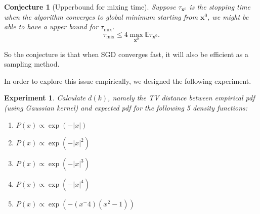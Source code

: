 \documentclass[preprint,12pt,3p]{elsarticle}
\newcommand{\bx}{\mathbf{x}}
\newcommand{\E}{\mathbb{E}}
\newtheorem{conjecture}{Conjecture}
\newtheorem{experiment}{Experiment}
\begin{document}
\begin{conjecture}[Upperbound for mixing time] Suppose $\tau_{\bx^0}$ is the stopping time when the algorithm converges to global minimum starting from $\bx^0$, we might be able to have a upper bound for $\tau_{\mathrm{mix}}$.
\[
\tau_{\mathrm{mix}} \leq 4 \max_{\bx^0}\E \tau_{\bx^0}.
\]
\end{conjecture}

So the conjecture is that when SGD converges fast, it will also be efficient as a sampling method.

In order to explore this issue empirically, we designed the following experiment.
\begin{experiment}
Calculate $d(k)$, namely the TV distance between empirical pdf (using Gaussian kernel) and expected pdf for the following 5 density functions:
\begin{enumerate}
    \item $P(x) \propto \exp(- |x|)$
    \item $P(x) \propto \exp(- |x|^2)$
    \item $P(x) \propto \exp(- |x|^3)$
    \item $P(x) \propto \exp(- |x|^4)$
    \item $P(x) \propto \exp(- (x^ - 4)(x^2 - 1))$
\end{enumerate} 
\end{experiment}
\end{document}
